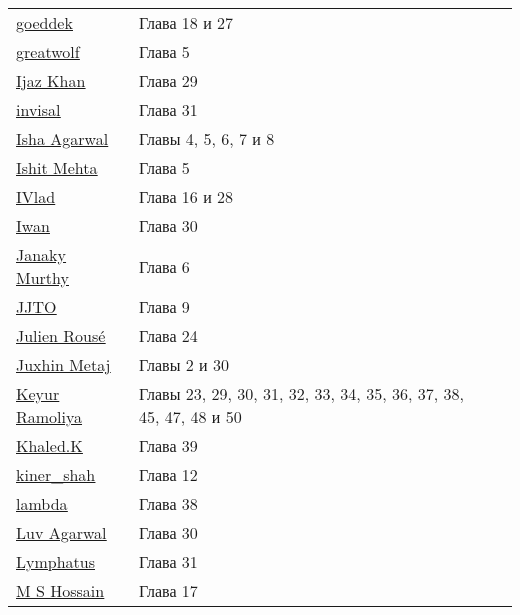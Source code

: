 \begin{tabular}{p{50mm}ll}
\href{https://stackoverflow.com/users/4515432/}{\underline{goeddek}} & Глава 18 и 27 \\
\href{https://stackoverflow.com/users/234175/}{\underline{greatwolf}} & Глава 5 \\
\href{https://stackoverflow.com/users/4550110/}{\underline{Ijaz Khan}} & Глава 29 \\
\href{https://stackoverflow.com/users/1332934/}{\underline{invisal}} & Глава 31 \\
\href{https://stackoverflow.com/users/5489591/}{\underline{Isha Agarwal}} & Главы 4, 5, 6, 7 и 8 \\
\href{https://stackoverflow.com/users/2516438/}{\underline{Ishit Mehta}} & Глава 5 \\
\href{https://stackoverflow.com/users/270287/}{\underline{IVlad}} & Глава 16 и 28 \\
\href{https://stackoverflow.com/users/4900669/}{\underline{Iwan}} & Глава 30 \\
\href{https://stackoverflow.com/users/5537078/}{\underline{Janaky Murthy}} & Глава 6 \\
\href{https://stackoverflow.com/users/6732642/}{\underline{JJTO}} & Глава 9 \\
\href{https://stackoverflow.com/users/3729797/}{\underline{Julien Rousé}} & Глава 24 \\
\href{https://stackoverflow.com/users/7190578/}{\underline{Juxhin Metaj}} & Главы 2 и 30 \\
\href{https://stackoverflow.com/users/6326344/}{\underline{Keyur Ramoliya}} & Главы 23, 29, 30, 31, 32, 33, 34, 35, 36, 37, 38, 45, 47, 48 и 50 \\
\href{https://stackoverflow.com/users/2128327/}{\underline{Khaled.K}} & Глава 39 \\
\href{https://stackoverflow.com/users/4688321/}{\underline{kiner\_shah}} & Глава 12 \\
\href{https://stackoverflow.com/users/7565799/}{\underline{lambda}} & Глава 38 \\
\href{https://stackoverflow.com/users/5016614/}{\underline{Luv Agarwal}} & Глава 30 \\
\href{https://stackoverflow.com/users/5222625/}{\underline{Lymphatus}} & Глава 31 \\
\href{https://stackoverflow.com/users/5882770/}{\underline{M S Hossain}} & Глава 17 \\
\end{tabular}

